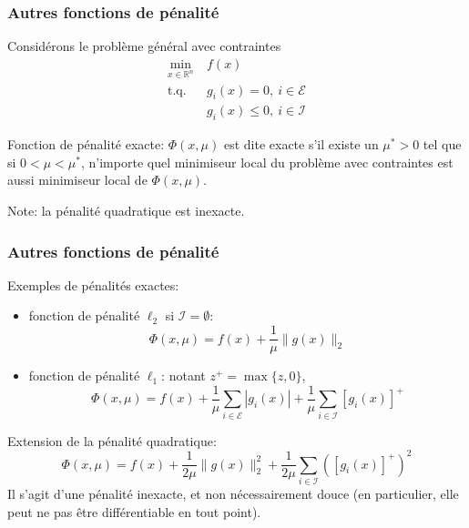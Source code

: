 \documentclass[t,usepdftitle=false]{beamer}
\def\red{\color{red}}
\def\cE{\mathcal{E}}
\def\cI{\mathcal{I}}
\def\RR{\mathbb{R}}
\begin{document}
\begin{frame}
\frametitle{Autres fonctions de pénalité}

Considérons le problème général avec contraintes
\begin{align*}
\min_{x \in \RR^n}\ & f(x) \\
\mbox{t.q. } & g_i(x) = 0,\ i \in \cE \\
& g_i(x) \leq 0,\ i \in \cI
\end{align*}

{\red Fonction de pénalité exacte}: $\Phi(x, \mu)$ est dite exacte s'il existe un $\mu^* > 0$ tel que si $0< \mu < \mu^*$, n'importe quel minimiseur local du problème avec contraintes est aussi minimiseur local de $\Phi(x, \mu)$.

\mbox{}

Note: la pénalité quadratique est inexacte.

\end{frame}

\begin{frame}
\frametitle{Autres fonctions de pénalité}

Exemples de pénalités exactes:
\begin{itemize}
\item 
fonction de pénalité $\ell_2$ si $\cI = \emptyset$:
$$
\Phi(x, \mu) = f(x) + \frac{1}{\mu} \| g(x) \|_2
$$
\item 
fonction de pénalité $\ell_1$:
notant $z^+ = \max\{z, 0\}$,
$$
\Phi(x, \mu) = f(x) + \frac{1}{\mu} \sum_{i \in \cE} | g_i(x) | + \frac{1}{\mu} \sum_{i \in \cI} [ g_i(x) ]^+
$$
\end{itemize}


Extension de la pénalité quadratique:
$$
\Phi(x, \mu) = f(x) + \frac{1}{2\mu} \| g(x) \|^2_2
+ \frac{1}{2\mu} \sum_{i \in \cI} \left( [ g_i(x) ]^+ \right)^2
$$
Il s'agit d'une pénalité inexacte, et non nécessairement douce (en particulier, elle peut ne pas être différentiable en tout point).

\end{frame}
\end{document}
